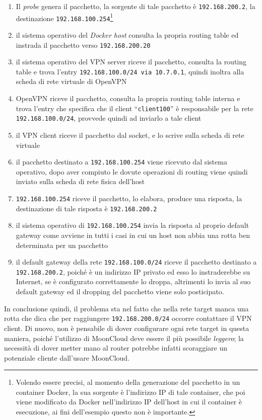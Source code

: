 \begin{enumerate}
  \item Il \textit{probe} genera il pacchetto, la sorgente di tale pacchetto è
  \texttt{192.168.200.2}, la destinazione \texttt{192.168.100.254}\footnote{Volendo essere
  precisi, al momento della generazione
  del pacchetto in un container Docker, la sua sorgente è l'indirizzo IP di tale
  container, che poi viene modificato da Docker nell'indirizzo IP dell'host in cui
  il container è esecuzione, ai fini dell'esempio questo non è importante.}
  \item il sistema operativo del \textit{Docker host} consulta la propria routing table
  ed instrada il pacchetto verso \texttt{192.168.200.20}
  \item il sistema operativo del VPN server riceve il pacchetto, consulta la
  routing table e trova l'entry \texttt{192.168.100.0/24 via 10.7.0.1}, quindi inoltra
  alla scheda di rete virtuale di OpenVPN
  \item OpenVPN riceve il pacchetto, consulta la propria routing table interna e
  trova l'entry che specifica che il client ``\texttt{client100}'' è responsabile per
  la rete \texttt{192.168.100.0/24}, provvede quindi ad inviarlo a tale client
  \item il VPN client riceve il pacchetto dal socket, e lo scrive sulla scheda di rete
  virtuale
  \item il pacchetto destinato a \texttt{192.168.100.254} viene ricevuto dal sistema
  operativo, dopo aver compiuto le dovute operazioni di routing viene quindi inviato
  sulla scheda di rete fisica dell'host
  \item \texttt{192.168.100.254} riceve il pacchetto, lo elabora, produce una risposta,
  la destinazione di tale risposta è \texttt{192.168.200.2}
  \item il sistema operativo di \texttt{192.168.100.254} invia la risposta al proprio
  default gateway come avviene in tutti i casi in cui un host non abbia una rotta
  ben determinata per un pacchetto
  \item il default gateway della rete \texttt{192.168.100.0/24} riceve il pacchetto
  destinato a \texttt{192.168.200.2}, poiché è un indirizzo IP privato ed esso
  lo instraderebbe su Internet, se è configurato correttamente lo droppa, altrimenti
  lo invia al suo default gateway ed il dropping del pacchetto viene solo posticipato.
\end{enumerate}
In conclusione quindi, il problema sta nel fatto che nella rete target manca una rotta
che dica che per raggiungere \texttt{192.168.200.0/24} occorre contattare il
VPN client. Di nuovo, non è pensabile di dover configurare ogni rete target in questa
maniera, poiché l'utilizzo di MoonCloud deve essere il più possibile \textit{leggero};
la necessità di dover metter mano al router potrebbe infatti scoraggiare un potenziale
cliente dall'usare MoonCloud.
